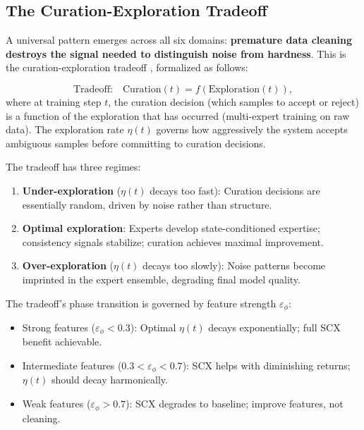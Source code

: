 \documentclass[twocolumn]{article}
\theoremstyle{definition}
\begin{document}
\subsection{The Curation-Exploration Tradeoff}
\label{sec:ce-tradeoff}

A universal pattern emerges across all six domains: \textbf{premature data cleaning destroys the signal needed to distinguish noise from hardness}. This is the curation-exploration tradeoff \cite{paperII}, formalized as follows:

\begin{equation}
\text{Tradeoff:} \quad \text{Curation}(t) = f(\text{Exploration}(t)),
\end{equation}
where at training step $t$, the curation decision (which samples to accept or reject) is a function of the exploration that has occurred (multi-expert training on raw data). The exploration rate $\eta(t)$ governs how aggressively the system accepts ambiguous samples before committing to curation decisions.

The tradeoff has three regimes:
\begin{enumerate}[nosep,leftmargin=*,itemsep=2pt]
  \item \textbf{Under-exploration} ($\eta(t)$ decays too fast): Curation decisions are essentially random, driven by noise rather than structure.
  \item \textbf{Optimal exploration}: Experts develop state-conditioned expertise; consistency signals stabilize; curation achieves maximal improvement.
  \item \textbf{Over-exploration} ($\eta(t)$ decays too slowly): Noise patterns become imprinted in the expert ensemble, degrading final model quality.
\end{enumerate}

The tradeoff's phase transition is governed by feature strength $\varepsilon_\phi$:
\begin{itemize}[nosep]
  \item Strong features ($\varepsilon_\phi < 0.3$): Optimal $\eta(t)$ decays exponentially; full SCX benefit achievable.
  \item Intermediate features ($0.3 < \varepsilon_\phi < 0.7$): SCX helps with diminishing returns; $\eta(t)$ should decay harmonically.
  \item Weak features ($\varepsilon_\phi > 0.7$): SCX degrades to baseline; improve features, not cleaning.
\end{itemize}
\end{document}

